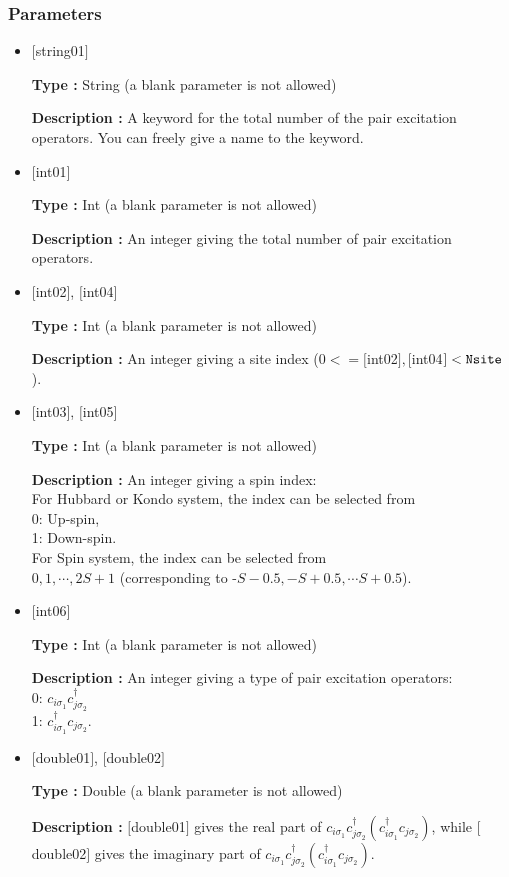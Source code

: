 \subsubsection{Parameters}
 \begin{itemize}

   \item  $[$string01$]$
   
    {\bf Type :} String (a blank parameter is not allowed)

   {\bf Description :} A keyword for the total number of the pair excitation operators. You can freely give a name to the keyword.

   \item  $[$int01$]$
   
    {\bf Type :} Int (a blank parameter is not allowed)

   {\bf Description :} An integer giving the total number of pair excitation operators.

  \item  $[$int02$]$, $[$int04$]$

 {\bf Type :} Int (a blank parameter is not allowed)

{\bf Description :} An integer giving a site index ($0<= [$int02$], [$int04$]<\verb|Nsite|$).
 
 
  \item  $[$int03$]$, $[$int05$]$

 {\bf Type :} Int (a blank parameter is not allowed)

{\bf Description :} 
An integer giving a spin index:\\
For Hubbard or Kondo system, the index can be selected from\\
0: Up-spin,\\
1: Down-spin.\\
For Spin system, the index can be selected from\\
$0, 1, \cdots, 2S+1$ (corresponding to -$S-0.5, -S+0.5, \cdots S+0.5$).

\item  $[$int06$]$

 {\bf Type :} Int (a blank parameter is not allowed)

{\bf Description :} 
An integer giving a type of pair excitation operators:\\
0: $ c_{i\sigma_1}c_{j\sigma_2}^{\dagger}$\\
1: $ c_{i\sigma_1}^{\dagger}c_{j\sigma_2}$.

\item  $[$double01$]$, $[$double02$]$

 {\bf Type :} Double (a blank parameter is not allowed)

{\bf Description :} $[$double01$]$ gives the real part of $ c_{i\sigma_1}c_{j\sigma_2}^{\dagger} ( c_{i\sigma_1}^{\dagger}c_{j\sigma_2})$, while $[$double02$]$ gives the imaginary part of $ c_{i\sigma_1}c_{j\sigma_2}^{\dagger} ( c_{i\sigma_1}^{\dagger}c_{j\sigma_2})$.

\end{itemize}

